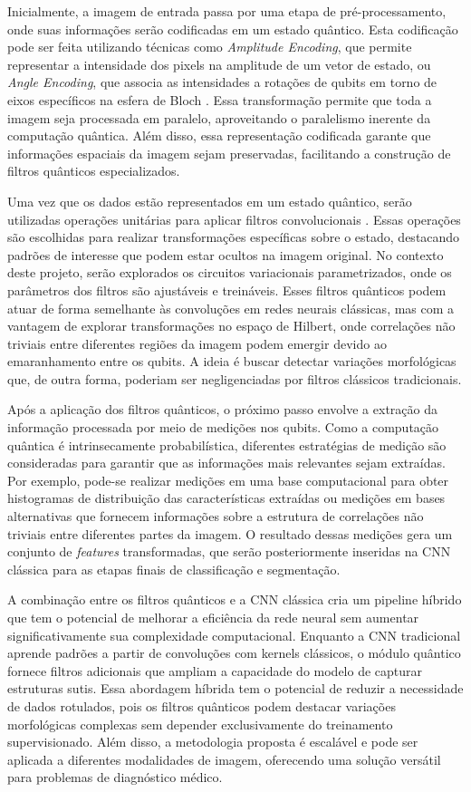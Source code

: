 \documentclass[a4paper, 12pt]{report}
\begin{document}
Inicialmente, a imagem de entrada passa por uma etapa de pré-processamento, onde suas informações serão codificadas em um estado quântico. Esta codificação pode ser feita utilizando técnicas como \textit{Amplitude Encoding}, que permite representar a intensidade dos pixels na amplitude de um vetor de estado, ou \textit{Angle Encoding}, que associa as intensidades a rotações de qubits em torno de eixos específicos na esfera de Bloch \cite{Divya}. Essa transformação permite que toda a imagem seja processada em paralelo, aproveitando o paralelismo inerente da computação quântica. Além disso, essa representação codificada garante que informações espaciais da imagem sejam preservadas, facilitando a construção de filtros quânticos especializados.

Uma vez que os dados estão representados em um estado quântico, serão utilizadas operações unitárias para aplicar filtros convolucionais \cite{Chen2022}. Essas operações são escolhidas para realizar transformações específicas sobre o estado, destacando padrões de interesse que podem estar ocultos na imagem original. No contexto deste projeto, serão explorados os circuitos variacionais parametrizados, onde os parâmetros dos filtros são ajustáveis e treináveis. Esses filtros quânticos podem atuar de forma semelhante às convoluções em redes neurais clássicas, mas com a vantagem de explorar transformações no espaço de Hilbert, onde correlações não triviais entre diferentes regiões da imagem podem emergir devido ao emaranhamento entre os qubits. A ideia é buscar detectar variações morfológicas que, de outra forma, poderiam ser negligenciadas por filtros clássicos tradicionais.

Após a aplicação dos filtros quânticos, o próximo passo envolve a extração da informação processada por meio de medições nos qubits. Como a computação quântica é intrinsecamente probabilística, diferentes estratégias de medição são consideradas para garantir que as informações mais relevantes sejam extraídas. Por exemplo, pode-se realizar medições em uma base computacional para obter histogramas de distribuição das características extraídas ou medições em bases alternativas que fornecem informações sobre a estrutura de correlações não triviais entre diferentes partes da imagem. O resultado dessas medições gera um conjunto de \textit{features} transformadas, que serão posteriormente inseridas na CNN clássica para as etapas finais de classificação e segmentação.

A combinação entre os filtros quânticos e a CNN clássica cria um pipeline híbrido \cite{Divya, Chen2022} que tem o potencial de melhorar a eficiência da rede neural sem aumentar significativamente sua complexidade computacional. Enquanto a CNN tradicional aprende padrões a partir de convoluções com kernels clássicos, o módulo quântico fornece filtros adicionais que ampliam a capacidade do modelo de capturar estruturas sutis. Essa abordagem híbrida tem o potencial de reduzir a necessidade de dados rotulados, pois os filtros quânticos podem destacar variações morfológicas complexas sem depender exclusivamente do treinamento supervisionado. Além disso, a metodologia proposta é escalável e pode ser aplicada a diferentes modalidades de imagem, oferecendo uma solução versátil para problemas de diagnóstico médico.
\end{document}
